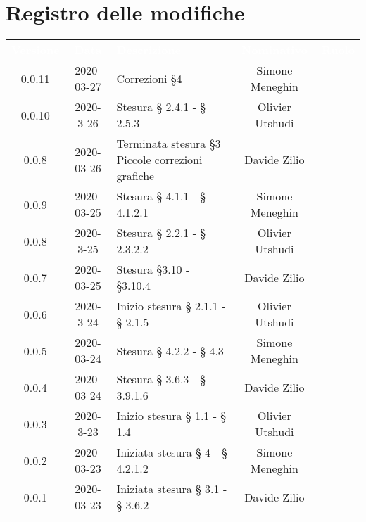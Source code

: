 \section*{Registro delle modifiche}
{
	\centering
	\begin{longtable}{ c c  C{4cm}  c  c }
		\textcolor{white}{\textbf{Versione}} & \textcolor{white}{\textbf{Data}} & \textcolor{white}{\textbf{Descrizione}} & \textcolor{white}{\textbf{Nominativo}} & \textcolor{white}{\textbf{Ruolo}}\\
		
		0.0.11 & 2020-03-27 & Correzioni \S 4 & Simone Meneghin &\reda{}\\
		0.0.10 & 2020-3-26 & Stesura § 2.4.1 - § 2.5.3 & Olivier Utshudi &\reda{}\\
		0.0.8 & 2020-03-26 & Terminata stesura \S 3 \newline Piccole correzioni grafiche & Davide Zilio &\reda{}\\
		0.0.9 & 2020-03-25 & Stesura § 4.1.1 - § 4.1.2.1 & Simone Meneghin &\reda{}\\	
		
		0.0.8 & 2020-3-25 & Stesura § 2.2.1 - § 2.3.2.2 & Olivier Utshudi &\reda{}\\
		
		0.0.7 & 2020-03-25 & Stesura \S 3.10 - \S 3.10.4 & Davide Zilio & \reda{}\\
		
		0.0.6 & 2020-3-24 & Inizio stesura § 2.1.1 - § 2.1.5 & Olivier Utshudi &\reda{}\\

		0.0.5 & 2020-03-24 & Stesura § 4.2.2 - § 4.3 & Simone Meneghin &\reda{}\\		
		
		0.0.4 & 2020-03-24 & Stesura § 3.6.3 - § 3.9.1.6 & Davide Zilio &\reda{}\\
		
		0.0.3 & 2020-3-23 & Inizio stesura § 1.1 - § 1.4 & Olivier Utshudi &\reda{}\\
		
		0.0.2 & 2020-03-23 & Iniziata stesura § 4 - § 4.2.1.2 & Simone Meneghin &\reda{}\\
		
		0.0.1 & 2020-03-23 & Iniziata stesura § 3.1 - § 3.6.2 & Davide Zilio &\reda{}\\		
		
	\end{longtable}

}